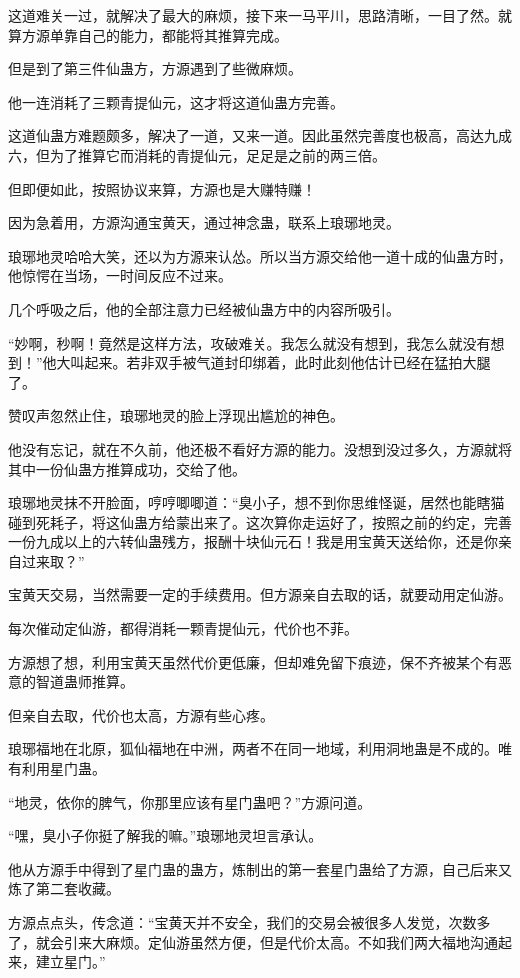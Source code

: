 \begin{this_body}
这道难关一过，就解决了最大的麻烦，接下来一马平川，思路清晰，一目了然。就算方源单靠自己的能力，都能将其推算完成。

但是到了第三件仙蛊方，方源遇到了些微麻烦。

他一连消耗了三颗青提仙元，这才将这道仙蛊方完善。

这道仙蛊方难题颇多，解决了一道，又来一道。因此虽然完善度也极高，高达九成六，但为了推算它而消耗的青提仙元，足足是之前的两三倍。

但即便如此，按照协议来算，方源也是大赚特赚！

因为急着用，方源沟通宝黄天，通过神念蛊，联系上琅琊地灵。

琅琊地灵哈哈大笑，还以为方源来认怂。所以当方源交给他一道十成的仙蛊方时，他惊愕在当场，一时间反应不过来。

几个呼吸之后，他的全部注意力已经被仙蛊方中的内容所吸引。

“妙啊，秒啊！竟然是这样方法，攻破难关。我怎么就没有想到，我怎么就没有想到！”他大叫起来。若非双手被气道封印绑着，此时此刻他估计已经在猛拍大腿了。

赞叹声忽然止住，琅琊地灵的脸上浮现出尴尬的神色。

他没有忘记，就在不久前，他还极不看好方源的能力。没想到没过多久，方源就将其中一份仙蛊方推算成功，交给了他。

琅琊地灵抹不开脸面，哼哼唧唧道：“臭小子，想不到你思维怪诞，居然也能瞎猫碰到死耗子，将这仙蛊方给蒙出来了。这次算你走运好了，按照之前的约定，完善一份九成以上的六转仙蛊残方，报酬十块仙元石！我是用宝黄天送给你，还是你亲自过来取？”

宝黄天交易，当然需要一定的手续费用。但方源亲自去取的话，就要动用定仙游。

每次催动定仙游，都得消耗一颗青提仙元，代价也不菲。

方源想了想，利用宝黄天虽然代价更低廉，但却难免留下痕迹，保不齐被某个有恶意的智道蛊师推算。

但亲自去取，代价也太高，方源有些心疼。

琅琊福地在北原，狐仙福地在中洲，两者不在同一地域，利用洞地蛊是不成的。唯有利用星门蛊。

“地灵，依你的脾气，你那里应该有星门蛊吧？”方源问道。

“嘿，臭小子你挺了解我的嘛。”琅琊地灵坦言承认。

他从方源手中得到了星门蛊的蛊方，炼制出的第一套星门蛊给了方源，自己后来又炼了第二套收藏。

方源点点头，传念道：“宝黄天并不安全，我们的交易会被很多人发觉，次数多了，就会引来大麻烦。定仙游虽然方便，但是代价太高。不如我们两大福地沟通起来，建立星门。”


\end{this_body}
